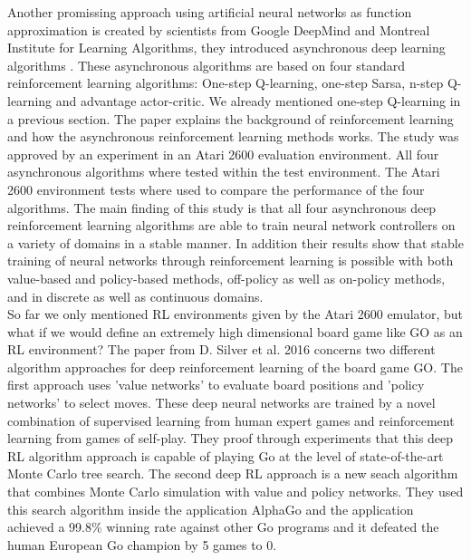 \documentclass[conference]{IEEEtran}
\begin{document}
Another promissing approach using artificial neural networks as function approximation is created by scientists from Google DeepMind and Montreal Institute for Learning Algorithms, they introduced asynchronous deep learning algorithms \cite{DBLP:journals/corr/MnihBMGLHSK16}. These asynchronous algorithms are based on four standard reinforcement learning algorithms: One-step Q-learning, one-step Sarsa, n-step Q-learning and advantage actor-critic. We already mentioned one-step Q-learning in a previous section. The paper explains the background of reinforcement learning and how the asynchronous reinforcement learning methods works. The study was approved by an experiment in an Atari 2600 evaluation environment. All four asynchronous algorithms where tested within the test environment. The Atari 2600 environment tests where used to compare the performance of the four algorithms. The main finding of this study is that all four asynchronous deep reinforcement learning algorithms are able to train neural network controllers on a variety of domains in a stable manner. In addition their results show that stable training of neural networks through reinforcement learning is possible with both value-based and policy-based methods, off-policy as well as on-policy methods, and in discrete as well as continuous domains. \\

So far we only mentioned RL environments given by the Atari 2600 emulator, but what if we would define an extremely high dimensional board game like GO as an RL environment? The paper from D. Silver et al. 2016 concerns two different algorithm approaches for deep reinforcement learning \cite{DRL:Silver_2016} of the board game GO. The first approach uses 'value networks' to evaluate board positions and 'policy networks' to select moves. These deep neural networks are trained by a novel combination of supervised learning from human expert games and reinforcement learning from games of self-play. They proof through experiments that this deep RL algorithm approach is capable of playing Go at the level of state-of-the-art Monte Carlo tree search. The second deep RL approach is a new seach algorithm that combines Monte Carlo simulation with value and policy networks. They used this search algorithm inside the application AlphaGo and the application achieved a 99.8\% winning rate against other Go programs and it defeated the human European Go champion by 5 games to 0. \\
\end{document}
